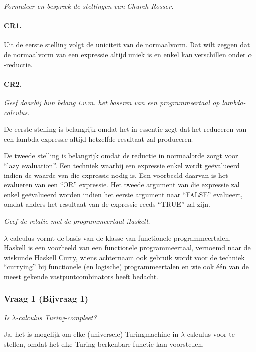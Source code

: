 \textit{Formuleer en bespreek de stellingen van Church-Rosser.}

\paragraph{CR1.} 

Uit de eerste stelling volgt de uniciteit van de normaalvorm. Dat wilt zeggen dat de normaalvorm van een expressie altijd uniek is en enkel kan verschillen onder $\alpha$-reductie.

\paragraph{CR2.} 

\textit{Geef daarbij hun belang i.v.m. het baseren van een programmeertaal op lambda-calculus.}

De eerste stelling is belangrijk omdat het in essentie zegt dat het reduceren van een lambda-expressie altijd hetzelfde resultaat zal produceren.

De tweede stelling is belangrijk omdat de reductie in normaalorde zorgt voor ``lazy evaluation''. Een techniek waarbij een expressie enkel wordt ge\"evalueerd indien de waarde van die expressie nodig is. Een voorbeeld daarvan is het evalueren van een ``OR'' expressie. Het tweede argument van die expressie zal enkel ge\"evalueerd worden indien het eerste argument naar ``FALSE'' evalueert, omdat anders het resultaat van de expressie reeds ``TRUE'' zal zijn.

\textit{Geef de relatie met de programmeertaal Haskell.}

$\lambda$-calculus vormt de basis van de klasse van functionele programmeertalen. Haskell is een voorbeeld van een functionele programmeertaal, vernoemd naar de wiskunde Haskell Curry, wiens achternaam ook gebruik wordt voor de techniek ``currying'' bij functionele (en logische) programmeertalen en wie ook \'e\'en van de meest gekende vastpuntcombinators heeft bedacht.

\subsubsection{Vraag 1 (Bijvraag 1)}

\textit{Is $\lambda$-calculus Turing-compleet?}

Ja, het is mogelijk om elke (universele) Turingmachine in $\lambda$-calculus voor te stellen, omdat het elke Turing-berkenbare functie kan voorstellen.


